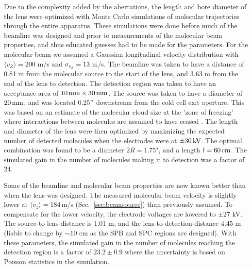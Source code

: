 Due to the complexity added by the aberrations, the length and bore diameter of the lens were optimized with Monte Carlo simulations of molecular trajectories through the entire apparatus. These simulations were done before much of the beamline was designed and prior to measurements of the molecular beam properties, and thus educated guesses had to be made for the parameters. For the molecular beam we assumed a Gaussian longitudinal velocity distribution with $\langle v_Z \rangle = 200$ m/s and $\sigma_{v_Z} = 13$ m/s. The beamline was taken to have a distance of 0.81 m from the molecular source to the start of the lens, and 3.63 m from the end of the lens to detection. The detection region was taken to have an acceptance area of $10\,\mathrm{mm}\times30\,\mathrm{mm}$. The source was taken to have a diameter of $20\,\mathrm{mm}$, and was located $0.25"$ downstream from the cold cell exit aperture. This was based on an estimate of the molecular cloud size at the 'zone of freezing' where interactions between molecules are assumed to have ceased \cite{hutzler2012buffer}. The length and diameter of the lens were then optimized by maximizing the expected number of detected molecules when the electrodes were at $\pm 30\,\mathrm{kV}$. The optimal combination was found to be a diameter $2R= 1.75$", and a length $l=60\,\mathrm{cm}$. The simulated gain in the number of molecules making it to detection was a factor of 24.

Some of the beamline and molecular beam properties are now known better than when the lens was designed. The measured molecular beam velocity is slightly lower at $\langle v_z \rangle = 184\,$m/s (Sec.~\ref{sec:beamsource}) than previously assumed. To compensate for the lower velocity, the electrode voltages are lowered to $\pm27$ kV. The source-to-lens-distance is 1.01 m, and the lens-to-detection-distance 4.45 m (liable to change by $\sim 10$ cm as the SPB and SPC regions are designed).  With these parameters, the simulated gain in the number of molecules reaching the detection region is a factor of $23.2 \pm 0.9$ where the uncertainty is based on Poisson statistics in the simulation.

